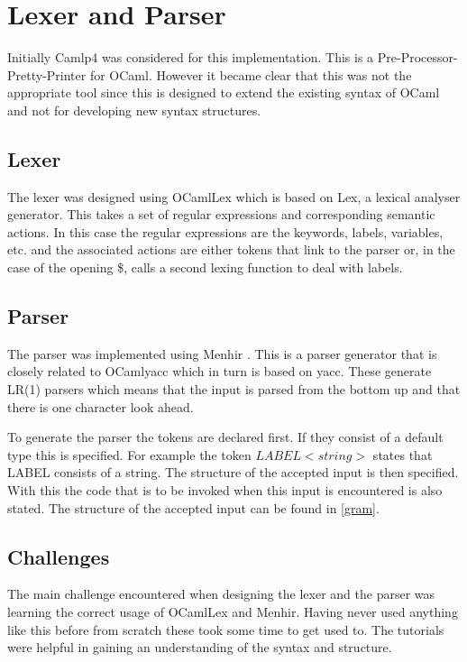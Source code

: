 \section{Lexer and Parser}

Initially Camlp4 \cite{camlp4} was considered for this implementation. This is a Pre-Processor-Pretty-Printer for OCaml. However it became clear that this was not the appropriate tool since this is designed to extend the existing syntax of OCaml and not for developing new syntax structures. 

\subsection{Lexer}
The lexer was designed using OCamlLex which is based on Lex, a lexical analyser generator. This takes a set of regular expressions and corresponding semantic actions. In this case the regular expressions are the keywords, labels, variables, etc. and the associated actions are either tokens that link to the parser or, in the case of the opening \$, calls a second lexing function to deal with labels. 

\subsection{Parser}
The parser was implemented using Menhir \cite{menhirRef}. This is a parser generator that is closely related to OCamlyacc which in turn is based on yacc. These generate LR(1) parsers which means that the input is parsed from the bottom up and that there is one character look ahead. 

To generate the parser the tokens are declared first. If they consist of a default type this is specified. For example the token $LABEL <string>$ states that LABEL consists of a string. The structure of the accepted input is then specified. With this the code that is to be invoked when this input is encountered is also stated. The structure of the accepted input can be found in \ref{gram}.

\subsection{Challenges}
The main challenge encountered when designing the lexer and the parser was learning the correct usage of OCamlLex and Menhir. Having never used anything like this before from scratch these took some time to get used to. The tutorials \cite{miniOcaml}\cite{miniOcaml}\cite{menhirBlog}\cite[Chapter 16]{realOcaml} were helpful in gaining an understanding of the syntax and structure. 

